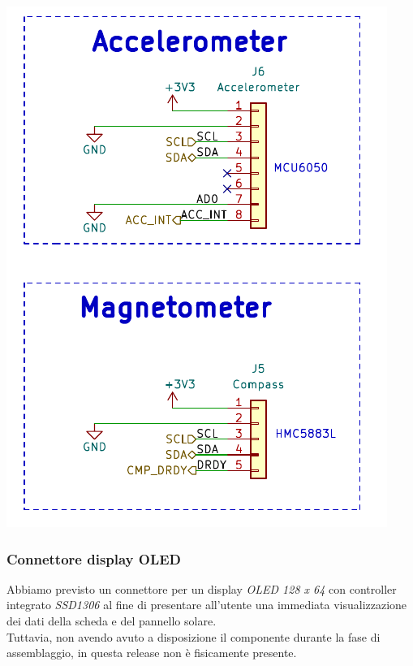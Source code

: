\begin{center}
\includegraphics[scale=0.6]{figures/image31.png}
\captionsetup{type=figure}
\end{center}

\hypertarget{connettore-display-oled}{%
\subsubsection{\texorpdfstring{Connettore display OLED\\
}{Connettore display OLED }}\label{connettore-display-oled}}

Abbiamo previsto un connettore per un display \emph{OLED 128 x 64} con
controller integrato \emph{SSD1306} al fine di presentare all'utente una
immediata visualizzazione dei dati della scheda e del pannello solare.\\
Tuttavia, non avendo avuto a disposizione il componente durante la fase
di assemblaggio, in questa release non è fisicamente presente.

